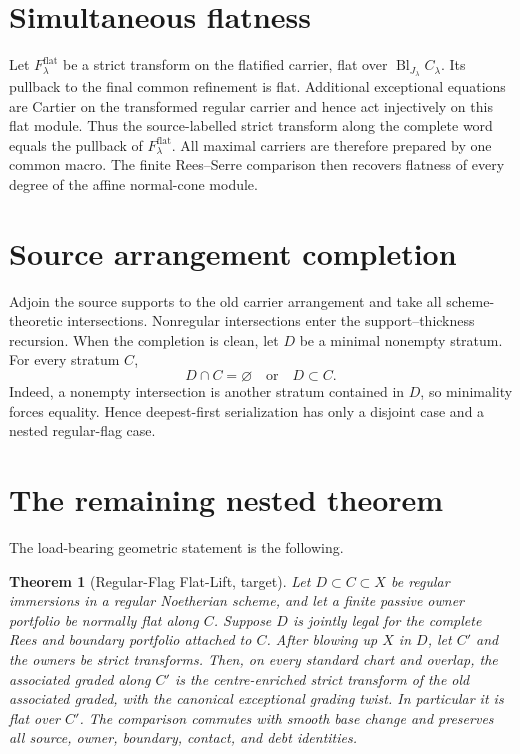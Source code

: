 \documentclass[11pt]{amsart}
\newtheorem{theorem}{Theorem}[section]
\begin{document}
\section{Simultaneous flatness}
Let $F_\lambda^{\mathrm{flat}}$ be a strict transform on the flatified carrier,
flat over $\operatorname{Bl}_{J_\lambda}C_\lambda$.  Its pullback to the final
common refinement is flat.  Additional exceptional equations are Cartier on
the transformed regular carrier and hence act injectively on this flat module.
Thus the source-labelled strict transform along the complete word equals the
pullback of $F_\lambda^{\mathrm{flat}}$.  All maximal carriers are therefore
prepared by one common macro.  The finite Rees--Serre comparison then recovers
flatness of every degree of the affine normal-cone module.

\section{Source arrangement completion}
Adjoin the source supports to the old carrier arrangement and take all
scheme-theoretic intersections.  Nonregular intersections enter the
support--thickness recursion.  When the completion is clean, let $D$ be a
minimal nonempty stratum.  For every stratum $C$,
\[
 D\cap C=\varnothing\quad\text{or}\quad D\subset C.
\]
Indeed, a nonempty intersection is another stratum contained in $D$, so
minimality forces equality.  Hence deepest-first serialization has only a
disjoint case and a nested regular-flag case.

\section{The remaining nested theorem}
The load-bearing geometric statement is the following.

\begin{theorem}[Regular-Flag Flat-Lift, target]
Let $D\subset C\subset X$ be regular immersions in a regular Noetherian scheme,
and let a finite passive owner portfolio be normally flat along $C$.  Suppose
$D$ is jointly legal for the complete Rees and boundary portfolio attached to
$C$.  After blowing up $X$ in $D$, let $C'$ and the owners be strict transforms.
Then, on every standard chart and overlap, the associated graded along $C'$ is
the centre-enriched strict transform of the old associated graded, with the
canonical exceptional grading twist.  In particular it is flat over $C'$.
The comparison commutes with smooth base change and preserves all source,
owner, boundary, contact, and debt identities.
\end{theorem}
\end{document}
